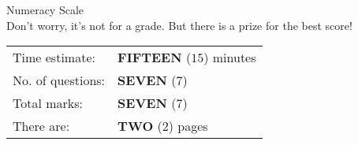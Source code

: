 \documentclass[12pt]{amsart}
\begin{document}
\begin{center}
{\Large Numeracy Scale}\\
\vspace{1cm}
Don't worry, it's not for a grade.
But there is a prize for the best score!
\vspace{1cm}
%

\begin{tabular}{@{}ll}
Time estimate:   &        {\rm \bf FIFTEEN} ($15$) minutes\\
No. of questions: &  {\rm\bf SEVEN} ($7$)\\
Total marks: & {\rm \bf SEVEN} ($7$)\\
There are: & {\rm \bf TWO} ($2$) pages\\
\end{tabular}

\vspace{1cm}

\end{center}
\end{document}
